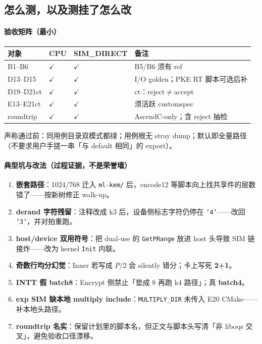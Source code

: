 \documentclass[UTF8,a4paper,11pt]{ctexart}
\theoremstyle{definition}
\theoremstyle{plain}
\theoremstyle{remark}
\numberwithin{figure}{section}
\numberwithin{table}{section}
\begin{document}
\subsection{怎么测，以及测挂了怎么改}
\label{sec:mlkem768-test}

\paragraph{验收矩阵（最小）}
\begin{center}
\small
\begin{tabular}{@{}L{2.6cm}L{1.4cm}L{2.2cm}L{6cm}@{}}
  \toprule
  对象 & CPU & SIM\_DIRECT & 备注 \\
  \midrule
  B1--B6 & $\checkmark$ & $\checkmark$ & B5/B6 须有 ref \\
  D13--D15 & $\checkmark$ & $\checkmark$ & I/O golden；PKE RT 脚本可选后补 \\
  D19--D21ct & $\checkmark$ & $\checkmark$ & ct：reject$\neq$accept \\
  E13--E21ct & $\checkmark$ & $\checkmark$ & 须活跃 customspec \\
  roundtrip & $\checkmark$ & $\checkmark$ & AscendC-only；含 reject 抽检 \\
  \bottomrule
\end{tabular}
\end{center}
声称通过前：同用例目录双模式都绿；用例根无 stray dump；默认即全量路径（不要求用户手搓一串「与 default 相同」的 export）。

\paragraph{典型坑与改法（过程证据，不是荣誉墙）}
\begin{enumerate}
  \item \textbf{嵌套路径}：1024/768 迁入 \texttt{ml-kem/} 后，encode12 等脚本向上找共享件的层数错了——按新树修正 walk-up。
  \item \textbf{derand 字符残留}：注释改成 k3 后，设备侧标志字符仍停在 \texttt{'4'}——改回 \texttt{'3'}，并对拍重跑。
  \item \textbf{host/device 双用符号}：把 dual-use 的 \texttt{GetPRange} 放进 host 头导致 SIM 链接炸——改为 kernel \texttt{Init} 内联。
  \item \textbf{奇数行均分幻觉}：Inner 若写成 $P/2$ 会 silently 错分；卡上写死 \textbf{2+1}。
  \item \textbf{INTT 假 batch8}：Encrypt 侧禁止「垫成 8 再跑 k4 路径」；真 \textbf{batch4}。
  \item \textbf{exp SIM 缺本地 multiply include}：\texttt{MULTIPLY\_DIR} 未传入 E20 CMake——补本地头路径。
  \item \textbf{roundtrip 名实}：保留计划里的脚本名，但正文与脚本头写清「非 liboqs 交叉」，避免验收口径漂移。
\end{enumerate}
\end{document}
